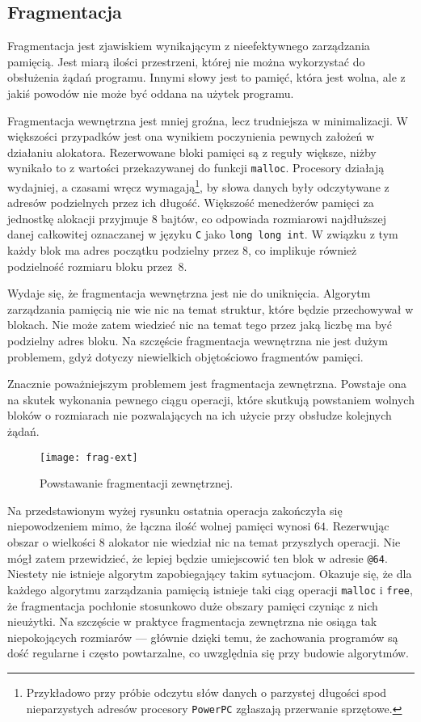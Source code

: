 \documentclass[12pt,a4paper,titlepage,twoside]{mwart}
\begin{document}
\subsection{Fragmentacja}

Fragmentacja jest zjawiskiem wynikającym z nieefektywnego zarządzania pamięcią.
Jest miarą ilości przestrzeni, której nie można wykorzystać do obsłużenia żądań
programu. Innymi słowy jest to pamięć, która jest wolna, ale z jakiś powodów
nie może być oddana na użytek programu.

Fragmentacja wewnętrzna jest mniej groźna, lecz trudniejsza w minimalizacji. W
większości przypadków jest ona wynikiem poczynienia pewnych założeń w działaniu
alokatora. Rezerwowane bloki pamięci są z reguły większe, niżby wynikało to z
wartości przekazywanej do funkcji \texttt{malloc}. Procesory działają
wydajniej, a czasami wręcz wymagają\footnote{Przykładowo przy próbie odczytu
słów danych o parzystej długości spod nieparzystych adresów procesory
\texttt{PowerPC} zgłaszają przerwanie sprzętowe.}, by słowa danych były
odczytywane z adresów podzielnych przez ich długość. Większość menedżerów
pamięci za jednostkę alokacji przyjmuje $8$ bajtów, co odpowiada rozmiarowi
najdłuższej danej całkowitej oznaczanej w języku \verb+C+ jako \verb+long long int+.
W związku z tym każdy blok ma adres początku podzielny przez $8$, co
implikuje również podzielność rozmiaru bloku przez~$8$.

Wydaje się, że fragmentacja wewnętrzna jest nie do uniknięcia. Algorytm
zarządzania pamięcią nie wie nic na temat struktur, które będzie przechowywał w
blokach. Nie może zatem wiedzieć nic na temat tego przez jaką liczbę ma być
podzielny adres bloku. Na szczęście fragmentacja wewnętrzna nie jest dużym
problemem, gdyż dotyczy niewielkich objętościowo fragmentów pamięci.

Znacznie poważniejszym problemem jest fragmentacja zewnętrzna. Powstaje ona na
skutek wykonania pewnego ciągu operacji, które skutkują powstaniem wolnych
bloków o rozmiarach nie pozwalających na ich użycie przy obsłudze kolejnych
żądań.

\begin{figure}[ht]
\centering
\texttt{[image: frag-ext]}
\caption{Powstawanie fragmentacji zewnętrznej.}
\end{figure}

Na przedstawionym wyżej rysunku ostatnia operacja zakończyła się niepowodzeniem
mimo, że łączna ilość wolnej pamięci wynosi $64$. Rezerwując obszar o wielkości
$8$ alokator nie wiedział nic na temat przyszłych operacji. Nie mógł zatem
przewidzieć, że lepiej będzie umiejscowić ten blok w adresie \verb+@64+.
Niestety nie istnieje algorytm zapobiegający takim sytuacjom. Okazuje się, że
dla każdego algorytmu zarządzania pamięcią istnieje taki ciąg operacji
\texttt{malloc} i \texttt{free}, że fragmentacja pochłonie stosunkowo duże
obszary pamięci czyniąc z nich nieużytki. Na szczęście w praktyce fragmentacja
zewnętrzna nie osiąga tak niepokojących rozmiarów --- głównie dzięki temu, że
zachowania programów są dość regularne i często powtarzalne, co uwzględnia się
przy budowie algorytmów.
\end{document}
